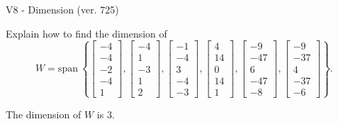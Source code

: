 \begin{exercise}
  \begin{exerciseTitle}V8 - Dimension (ver. 725)\end{exerciseTitle}
  \begin{exerciseStatement}
    Explain how to find the dimension of 
\[W=\mathrm{span}\ \left\{\left[\begin{array}{r}
-4 \\
-4 \\
-2 \\
-4 \\
1
\end{array}\right] , \left[\begin{array}{r}
-4 \\
1 \\
-3 \\
1 \\
2
\end{array}\right] , \left[\begin{array}{r}
-1 \\
-4 \\
3 \\
-4 \\
-3
\end{array}\right] , \left[\begin{array}{r}
4 \\
14 \\
0 \\
14 \\
1
\end{array}\right] , \left[\begin{array}{r}
-9 \\
-47 \\
6 \\
-47 \\
-8
\end{array}\right] , \left[\begin{array}{r}
-9 \\
-37 \\
4 \\
-37 \\
-6
\end{array}\right]\right\}.\]



  \end{exerciseStatement}
  \begin{exerciseAnswer}
   The dimension of \(W\) is  \(3\).
  


  \end{exerciseAnswer}
\end{exercise}
